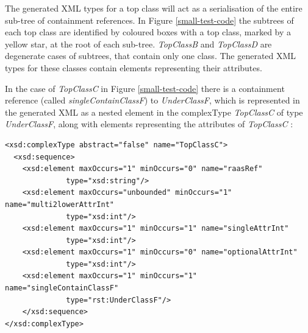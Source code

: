 \documentclass[11pt]{article}
\providecommand{\DIFaddbegin}{} %
\providecommand{\DIFaddend}{} %
\providecommand{\DIFdelbegin}{} %
\providecommand{\DIFdelend}{} %
\begin{document}
The generated XML types for a top class will act as a serialisation of the entire sub-tree of containment references. In Figure \ref{small-test-code} the subtrees of each top class are identified by coloured boxes with a top class, marked by a yellow star, at the root of each sub-tree. {\em TopClassB} and {\em TopClassD} are degenerate cases of subtrees, that contain only one class. The generated XML types for these classes contain elements representing their attributes.

In the case of {\em TopClassC} in Figure \ref{small-test-code} there is a containment reference (called {\em singleContainClassF}) to {\em UnderClassF}, which is represented in the generated XML as a nested element in the complexType  {\em TopClassC} of type  {\em UnderClassF}, along with elements representing the attributes of {\em TopClassC} :
\DIFdelbegin %
\DIFdelend \DIFaddbegin \begin{verbatim}
<xsd:complexType abstract="false" name="TopClassC">
  <xsd:sequence>
    <xsd:element maxOccurs="1" minOccurs="0" name="raasRef"
              type="xsd:string"/>
    <xsd:element maxOccurs="unbounded" minOccurs="1" name="multi2lowerAttrInt" 
              type="xsd:int"/>
    <xsd:element maxOccurs="1" minOccurs="1" name="singleAttrInt" 
              type="xsd:int"/>
    <xsd:element maxOccurs="1" minOccurs="0" name="optionalAttrInt" 
              type="xsd:int"/>
    <xsd:element maxOccurs="1" minOccurs="1" name="singleContainClassF" 
              type="rst:UnderClassF"/>
    </xsd:sequence>
</xsd:complexType>
\end{verbatim}
\DIFaddend 
\end{document}

